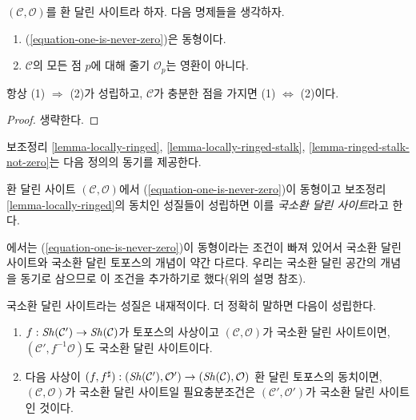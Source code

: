 \begin{lemma}
\label{lemma-ringed-stalk-not-zero}
$(\mathcal{C}, \mathcal{O})$를 환 달린 사이트라 하자. 다음 명제들을 생각하자.
\begin{enumerate}
\item (\ref{equation-one-is-never-zero})은 동형이다.
\item $\mathcal{C}$의 모든 점 $p$에 대해 줄기 $\mathcal{O}_p$는 영환이 아니다.
\end{enumerate}
항상 (1) $\Rightarrow$ (2)가 성립하고, $\mathcal{C}$가 충분한 점을 가지면
(1) $\Leftrightarrow$ (2)이다.
\end{lemma}

\begin{proof}
생략한다.
\end{proof}

\noindent
보조정리 \ref{lemma-locally-ringed},
\ref{lemma-locally-ringed-stalk},
\ref{lemma-ringed-stalk-not-zero}는 다음 정의의 동기를 제공한다.

\begin{definition}
\label{definition-locally-ringed}
환 달린 사이트 $(\mathcal{C}, \mathcal{O})$에서
(\ref{equation-one-is-never-zero})이 동형이고 보조정리
\ref{lemma-locally-ringed}의 동치인 성질들이 성립하면 이를
{\it 국소환 달린 사이트}라고 한다.
\end{definition}

\noindent
\cite[Expos\'e IV, Exercice 13.9]{SGA4}에서는
(\ref{equation-one-is-never-zero})이 동형이라는 조건이 빠져 있어서
국소환 달린 사이트와 국소환 달린 토포스의 개념이 약간 다르다.
우리는 국소환 달린 공간의 개념을 동기로 삼으므로 이 조건을
추가하기로 했다(위의 설명 참조).

\begin{lemma}
\label{lemma-locally-ringed-intrinsic}
국소환 달린 사이트라는 성질은 내재적이다. 더 정확히 말하면 다음이 성립한다.
\begin{enumerate}
\item $f : \mathop{\mathit{Sh}}\nolimits(\mathcal{C}') \to \mathop{\mathit{Sh}}\nolimits(\mathcal{C})$가 토포스의 사상이고
$(\mathcal{C}, \mathcal{O})$가 국소환 달린 사이트이면,
$(\mathcal{C}', f^{-1}\mathcal{O})$도 국소환 달린 사이트이다.
\item 다음 사상이
$(f, f^\sharp) : (\mathop{\mathit{Sh}}\nolimits(\mathcal{C}'), \mathcal{O}')
\to (\mathop{\mathit{Sh}}\nolimits(\mathcal{C}), \mathcal{O})$
환 달린 토포스의 동치이면, $(\mathcal{C}, \mathcal{O})$가 국소환 달린
사이트일 필요충분조건은 $(\mathcal{C}', \mathcal{O}')$가 국소환 달린
사이트인 것이다.
\end{enumerate}
\end{lemma}

